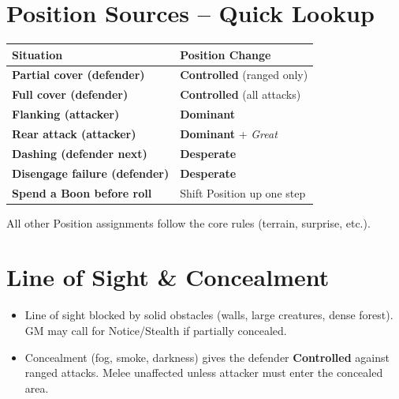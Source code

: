 \documentclass[12pt]{article}
\newcommand{\pos}[1]{\textbf{#1}}
\newcommand{\effect}[1]{\textit{#1}}
\begin{document}
\section{Position Sources -- Quick Lookup}
\begin{center}
\begin{tabular}{>{\bfseries}l l}
\toprule
\textbf{Situation} & \textbf{Position Change}\\
\midrule
Partial cover (defender)     & \pos{Controlled} (ranged only)\\
Full cover (defender)        & \pos{Controlled} (all attacks)\\
Flanking (attacker)          & \pos{Dominant}\\
Rear attack (attacker)       & \pos{Dominant} + \effect{Great}\\
Dashing (defender next)      & \pos{Desperate}\\
Disengage failure (defender) & \pos{Desperate}\\
Spend a Boon before roll     & Shift Position up one step\\
\bottomrule
\end{tabular}
\end{center}
\noindent All other Position assignments follow the core rules (terrain, surprise, etc.).

\section{Line of Sight \& Concealment}
\begin{itemize}[noitemsep]
    \item Line of sight blocked by solid obstacles (walls, large creatures, dense forest). GM may call for Notice/Stealth if partially concealed.
    \item Concealment (fog, smoke, darkness) gives the defender \pos{Controlled} against ranged attacks. Melee unaffected unless attacker must enter the concealed area.
\end{itemize}
\end{document}
